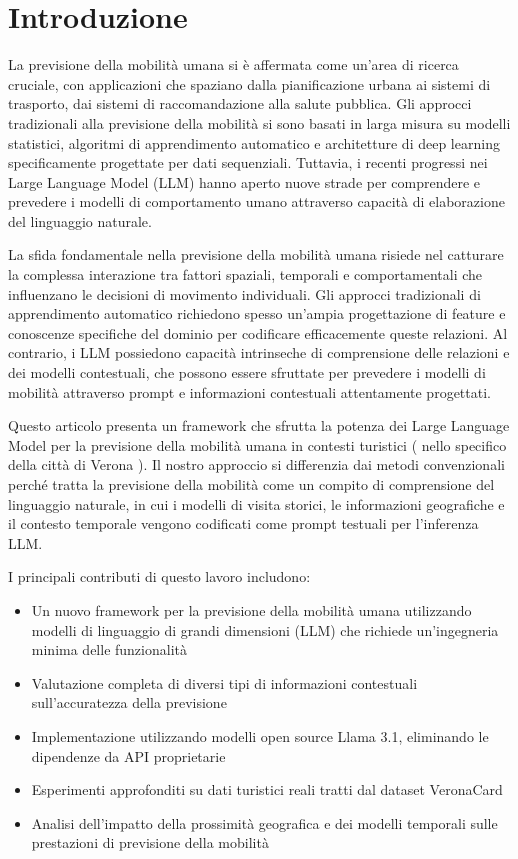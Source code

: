 \section{Introduzione}
\fancyhead{}    %
La previsione della mobilità umana si è affermata come un'area di ricerca cruciale, con applicazioni che spaziano dalla pianificazione urbana ai sistemi di trasporto, dai sistemi di raccomandazione alla salute pubblica. Gli approcci tradizionali alla previsione della mobilità si sono basati in larga misura su modelli statistici, algoritmi di apprendimento automatico e architetture di deep learning specificamente progettate per dati sequenziali. Tuttavia, i recenti progressi nei Large Language Model (LLM) hanno aperto nuove strade per comprendere e prevedere i modelli di comportamento umano attraverso capacità di elaborazione del linguaggio naturale.

La sfida fondamentale nella previsione della mobilità umana risiede nel catturare la complessa interazione tra fattori spaziali, temporali e comportamentali che influenzano le decisioni di movimento individuali. Gli approcci tradizionali di apprendimento automatico richiedono spesso un'ampia progettazione di feature e conoscenze specifiche del dominio per codificare efficacemente queste relazioni. Al contrario, i LLM possiedono capacità intrinseche di comprensione delle relazioni e dei modelli contestuali, che possono essere sfruttate per prevedere i modelli di mobilità attraverso prompt e informazioni contestuali attentamente progettati.

Questo articolo presenta un framework che sfrutta la potenza dei Large Language Model per la previsione della mobilità umana in contesti turistici ( nello specifico della città di Verona ). Il nostro approccio si differenzia dai metodi convenzionali perché tratta la previsione della mobilità come un compito di comprensione del linguaggio naturale, in cui i modelli di visita storici, le informazioni geografiche e il contesto temporale vengono codificati come prompt testuali per l'inferenza LLM.

I principali contributi di questo lavoro includono:

\begin{itemize}
\item Un nuovo framework per la previsione della mobilità umana utilizzando modelli di linguaggio di grandi dimensioni (LLM) che richiede un'ingegneria minima delle funzionalità
\item Valutazione completa di diversi tipi di informazioni contestuali sull'accuratezza della previsione
\item Implementazione utilizzando modelli open source Llama 3.1, eliminando le dipendenze da API proprietarie
\item Esperimenti approfonditi su dati turistici reali tratti dal dataset VeronaCard
\item Analisi dell'impatto della prossimità geografica e dei modelli temporali sulle prestazioni di previsione della mobilità
\end{itemize}